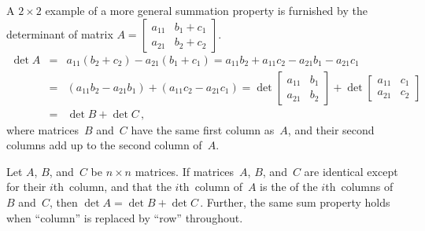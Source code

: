 \begin{example} \label{eg:cpdet2}
A \(2\times2\) example of a more general summation property is furnished by the determinant of matrix \(A=\begin{bmatrix} a_{11}&b_1+c_1\\a_{21}&b_2+c_2 \end{bmatrix}\).
\begin{eqnarray*}
\det A&=&a_{11}(b_2+c_2)-a_{21}(b_1+c_1)
=a_{11}b_2+a_{11}c_2-a_{21}b_1-a_{21}c_1
\\&=&(a_{11}b_2-a_{21}b_1)+(a_{11}c_2-a_{21}c_1)
=\det\begin{bmatrix} a_{11}&b_1\\a_{21}&b_2 \end{bmatrix}
+\det\begin{bmatrix} a_{11}&c_1\\a_{21}&c_2 \end{bmatrix}
\\&=&\det B+\det C\,,
\end{eqnarray*}
where matrices~\(B\) and~\(C\) have the same first column as~\(A\), and their second columns add up to the second column of~\(A\).
\end{example}





\begin{theorem} \label{thm:rpdet:v} 
Let \(A\), \(B\), and~\(C\) be \(n\times n\) matrices.
If matrices~\(A\), \(B\), and~\(C\) are identical except for their \(i\)th~column, and that the \(i\)th~column of~\(A\) is the  of the \(i\)th~columns of \(B\) and~\(C\), then \(\det A=\det B+\det C\)\,.
Further, the same sum property holds when ``column'' is replaced by ``row'' throughout.
\end{theorem}


